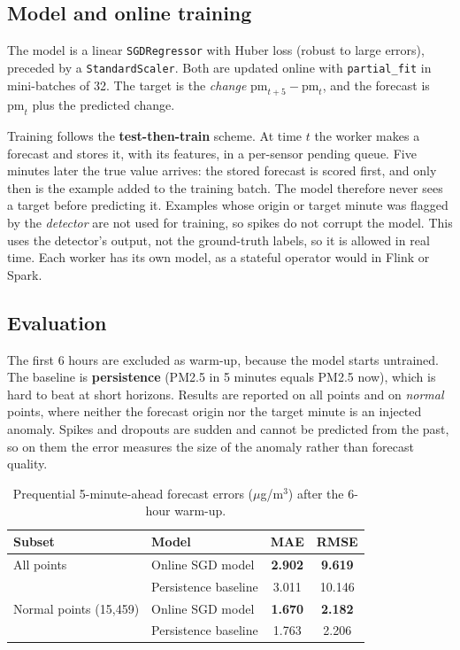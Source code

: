 \documentclass[11pt]{article}
\begin{document}
\subsection{Model and online training}
The model is a linear \texttt{SGDRegressor} with Huber loss (robust to large errors), preceded by a \texttt{StandardScaler}. Both are updated online with \texttt{partial\_fit} in mini-batches of 32. The target is the \emph{change} $\text{pm}_{t+5}-\text{pm}_t$, and the forecast is $\text{pm}_t$ plus the predicted change.

Training follows the \textbf{test-then-train} scheme. At time $t$ the worker makes a forecast and stores it, with its features, in a per-sensor pending queue. Five minutes later the true value arrives: the stored forecast is scored first, and only then is the example added to the training batch. The model therefore never sees a target before predicting it. Examples whose origin or target minute was flagged by the \emph{detector} are not used for training, so spikes do not corrupt the model. This uses the detector's output, not the ground-truth labels, so it is allowed in real time. Each worker has its own model, as a stateful operator would in Flink or Spark.

\subsection{Evaluation}
The first 6 hours are excluded as warm-up, because the model starts untrained. The baseline is \textbf{persistence} (PM2.5 in 5 minutes equals PM2.5 now), which is hard to beat at short horizons. Results are reported on all points and on \emph{normal} points, where neither the forecast origin nor the target minute is an injected anomaly. Spikes and dropouts are sudden and cannot be predicted from the past, so on them the error measures the size of the anomaly rather than forecast quality.

\begin{table}[H]
\centering\small
\begin{tabular}{@{}llcc@{}}
\toprule
Subset & Model & MAE & RMSE \\
\midrule
All points & Online SGD model & \textbf{2.902} & \textbf{9.619} \\
 & Persistence baseline & 3.011 & 10.146 \\
\midrule
Normal points (15{,}459) & Online SGD model & \textbf{1.670} & \textbf{2.182} \\
 & Persistence baseline & 1.763 & 2.206 \\
\bottomrule
\end{tabular}
\caption{Prequential 5-minute-ahead forecast errors ($\mu$g/m$^3$) after the 6-hour warm-up.}
\label{tab:ml}
\end{table}
\end{document}
